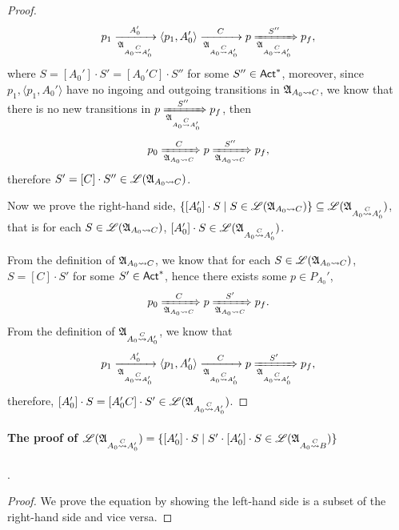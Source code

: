 {\begin{proof}
    $$p_1\xrightarrow[{\mathfrak{A} }_{A_0\stackrel{C}\rightsquigarrow A_0'}]{A_0'}\langle p_1,A_0'\rangle\xrightarrow[{\mathfrak{A} }_{A_0\stackrel{C}\rightsquigarrow A_0'}]{C}p\xRightarrow[{\mathfrak{A} }_{A_0\stackrel{C}\rightsquigarrow A_0'}]{S''}p_f,$$
    where $S = [A_0']\cdot S' = [A_0'C]\cdot S''$ for some $S''\in{\sf Act}^*$, moreover, since $p_1, \langle p_1,A_0'\rangle$ have no ingoing and outgoing transitions in ${\mathfrak{A} }_{A_0\rightsquigarrow C}$, we know that there is no new transitions in $p\xRightarrow[{\mathfrak{A} }_{A_0\stackrel{C}\rightsquigarrow A_0'}]{S''}p_f$, then
    $$p_0\xRightarrow[{\mathfrak{A} }_{A_0\rightsquigarrow C}]{C}p\xRightarrow[{\mathfrak{A} }_{A_0\rightsquigarrow C}]{S''}p_f,$$
    therefore $S' = [C]\cdot S''\in{\mathscr{L} }({\mathfrak{A} }_{A_0\rightsquigarrow C})$.

    Now we prove the right-hand side, $\{[A_0']\cdot S \mid S\in{\mathscr{L} }({\mathfrak{A} }_{A_0\rightsquigarrow C})\}\subseteq {\mathscr{L} }({\mathfrak{A} }_{A_0\stackrel{C}\rightsquigarrow A_0'}) $, that is 
    for each $S\in{\mathscr{L} }({\mathfrak{A} }_{A_0\rightsquigarrow C})$, $[A_0']\cdot S\in{\mathscr{L} }({\mathfrak{A} }_{A_0\stackrel{C}\rightsquigarrow A_0'})$.

    From the definition of ${\mathfrak{A} }_{A_0\rightsquigarrow C}$, we know that for each $S\in {\mathscr{L} }({\mathfrak{A} }_{A_0\rightsquigarrow C})$, $S = [C]\cdot S'$ for some $S'\in{\sf Act}^*$, hence there exists some $p\in P_{A_0}'$, 
    $$p_0\xRightarrow[{\mathfrak{A} }_{A_0\rightsquigarrow C}]{C}p\xRightarrow[{\mathfrak{A} }_{A_0\rightsquigarrow C}]{S'}p_f.$$
    From the definition of ${\mathfrak{A} }_{A_0\stackrel{C}\rightsquigarrow A_0'}$, we know that
    $$p_1\xrightarrow[{\mathfrak{A} }_{A_0\stackrel{C}\rightsquigarrow A_0'}]{A_0'}\langle p_1,A_0'\rangle\xrightarrow[{\mathfrak{A} }_{A_0\stackrel{C}\rightsquigarrow A_0'}]{C}p\xRightarrow[{\mathfrak{A} }_{A_0\stackrel{C}\rightsquigarrow A_0'}]{S'}p_f,$$
    therefore, $[A_0']\cdot S = [A_0'C]\cdot S'\in{\mathscr{L} }({\mathfrak{A} }_{A_0\stackrel{C}\rightsquigarrow A_0'})$.
\end{proof}

\paragraph*{The proof of ${\mathscr{L} }({\mathfrak{A} }_{A_0\stackrel{C}\rightsquigarrow A_0'}) = \{[A_0']\cdot S \mid S'\cdot [A_0']\cdot S\in{\mathscr{L} }({\mathfrak{A} }_{A_0\stackrel{C}\rightsquigarrow B})\}$}.
\begin{proof}
    We prove the equation by showing the left-hand side is a subset of the right-hand side and vice versa.


\end{proof}}
